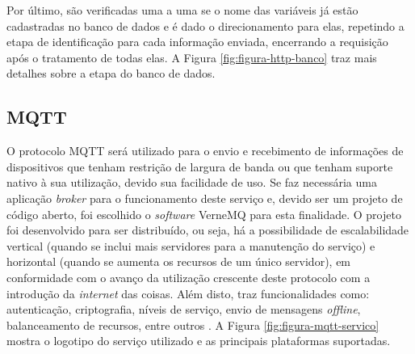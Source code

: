     	Por último, são verificadas uma a uma se o nome das variáveis já estão cadastradas no banco de dados e é dado o direcionamento para elas, repetindo a etapa de identificação para cada informação enviada, encerrando a requisição após o tratamento de todas elas. A Figura \ref{fig:figura-http-banco} traz mais detalhes sobre a etapa do banco de dados.
    	
    	\begin{figure}[!h]
    	\end{figure}
        
        \subsection{MQTT}
        \label{sec:aquisicao-mqtt}
        O protocolo \gls{MQTT} será utilizado para o envio e recebimento de informações de dispositivos que tenham restrição de largura de banda ou que tenham suporte nativo à sua utilização, devido sua facilidade de uso. Se faz necessária uma aplicação \textit{broker} para o funcionamento deste serviço e, devido ser um projeto de código aberto, foi escolhido o \textit{software} VerneMQ para esta finalidade. O projeto foi desenvolvido para ser distribuído, ou seja, há a possibilidade de escalabilidade vertical (quando se inclui mais servidores para a manutenção do serviço) e horizontal (quando se aumenta os recursos de um único servidor), em conformidade com o avanço da utilização crescente deste protocolo com a introdução da \textit{internet} das coisas. Além disto, traz funcionalidades como: autenticação, criptografia, níveis de serviço, envio de mensagens \textit{offline}, balanceamento de recursos, entre outros \cite{VerneMQ}. A Figura \ref{fig:figura-mqtt-servico} mostra o logotipo do serviço utilizado e as principais plataformas suportadas.
        
